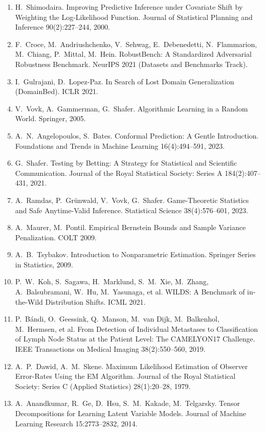 \documentclass[conference]{IEEEtran}
\theoremstyle{plain}
\theoremstyle{definition}
\begin{document}
\begin{enumerate}
\item H.~Shimodaira. Improving Predictive Inference under Covariate Shift by Weighting the Log-Likelihood Function. Journal of Statistical Planning and Inference 90(2):227--244, 2000.
\item F.~Croce, M.~Andriushchenko, V.~Sehwag, E.~Debenedetti, N.~Flammarion, M.~Chiang, P.~Mittal, M.~Hein. RobustBench: A Standardized Adversarial Robustness Benchmark. NeurIPS 2021 (Datasets and Benchmarks Track).
\item I.~Gulrajani, D.~Lopez-Paz. In Search of Lost Domain Generalization (DomainBed). ICLR 2021.
\item V.~Vovk, A.~Gammerman, G.~Shafer. Algorithmic Learning in a Random World. Springer, 2005.
\item A.~N.~Angelopoulos, S.~Bates. Conformal Prediction: A Gentle Introduction. Foundations and Trends in Machine Learning 16(4):494--591, 2023.
\item G.~Shafer. Testing by Betting: A Strategy for Statistical and Scientific Communication. Journal of the Royal Statistical Society: Series A 184(2):407--431, 2021.
\item A.~Ramdas, P.~Gr\"unwald, V.~Vovk, G.~Shafer. Game-Theoretic Statistics and Safe Anytime-Valid Inference. Statistical Science 38(4):576--601, 2023.
\item A.~Maurer, M.~Pontil. Empirical Bernstein Bounds and Sample Variance Penalization. COLT 2009.
\item A.~B.~Tsybakov. Introduction to Nonparametric Estimation. Springer Series in Statistics, 2009.
\item P.~W.~Koh, S.~Sagawa, H.~Marklund, S.~M.~Xie, M.~Zhang, A.~Balsubramani, W.~Hu, M.~Yasunaga, et al. WILDS: A Benchmark of in-the-Wild Distribution Shifts. ICML 2021.
\item P.~B\'andi, O.~Geessink, Q.~Manson, M.~van Dijk, M.~Balkenhol, M.~Hermsen, et al. From Detection of Individual Metastases to Classification of Lymph Node Status at the Patient Level: The CAMELYON17 Challenge. IEEE Transactions on Medical Imaging 38(2):550--560, 2019.
\item A.~P.~Dawid, A.~M.~Skene. Maximum Likelihood Estimation of Observer Error-Rates Using the EM Algorithm. Journal of the Royal Statistical Society: Series C (Applied Statistics) 28(1):20--28, 1979.
\item A.~Anandkumar, R.~Ge, D.~Hsu, S.~M.~Kakade, M.~Telgarsky. Tensor Decompositions for Learning Latent Variable Models. Journal of Machine Learning Research 15:2773--2832, 2014.

\end{enumerate}
\end{document}
